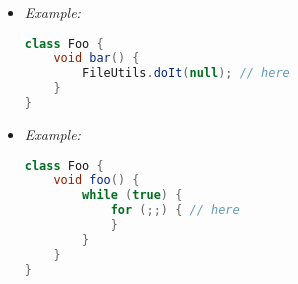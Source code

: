 \begin{itemize}
	\item {}
{\it Example:}
\begin{lstlisting}[language=Java]
class Foo {
	void bar() {
		FileUtils.doIt(null); // here
	}
}
\end{lstlisting}

	\item {}
{\it Example:}
\begin{lstlisting}[language=Java]
class Foo {
	void foo() {
		while (true) {
			for (;;) { // here
			}
		}
	}
}
\end{lstlisting}

\end{itemize}
